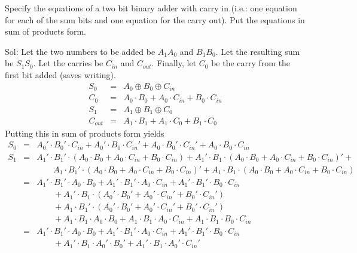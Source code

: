 \begin{example}
Specify the equations of a two bit binary adder with carry in (i.e.: one equation for each of the sum bits and one equation for the carry out).  Put the equations in sum of products form.

{\color{ans}Sol:
Let the two numbers to be added be $A_1 A_0$ and $B_1 B_0$.  Let the resulting sum be $S_1 S_0$.  Let the carries be $C_{in}$ and $C_{out}$.  Finally, let $C_0$ be the carry from the first bit added (saves writing).
\begin{eqnarray}
S_0 & = & A_0 \oplus B_0 \oplus C_{in} \\
C_0 & = & A_0\cdot B_0 + A_0\cdot C_{in} + B_0\cdot C_{in} \\
S_1 & = & A_1 \oplus B_1 \oplus C_0\\
C_{out} & = & A_1 \cdot B_1 + A_1 \cdot C_0 + B_1 \cdot C_0
\end{eqnarray}
Putting this in sum of products form yields
\begin{eqnarray}
S_0 & = & A_0' \cdot B_0' \cdot C_{in} +
          A_0' \cdot B_0 \cdot C_{in}' +
          A_0 \cdot B_0' \cdot C_{in}' +
          A_0 \cdot B_0 \cdot C_{in} \\
S_1 & = & A_1' \cdot B_1' \cdot (A_0\cdot B_0 + A_0\cdot C_{in} + B_0\cdot C_{in}) +
          A_1' \cdot B_1 \cdot (A_0\cdot B_0 + A_0\cdot C_{in} + B_0\cdot C_{in})' + \\
    & & \qquad A_1 \cdot B_1' \cdot (A_0\cdot B_0 + A_0\cdot C_{in} + B_0\cdot C_{in})' +
          A_1 \cdot B_1 \cdot (A_0\cdot B_0 + A_0\cdot C_{in} + B_0\cdot C_{in}) \\
    & = & A_1' \cdot B_1' \cdot A_0\cdot B_0 + A_1' \cdot B_1' \cdot A_0 \cdot C_{in}
          + A_1' \cdot B_1' \cdot B_0\cdot C_{in} \\
    & & \qquad
          + A_1' \cdot B_1 \cdot (A_0'\cdot B_0' + A_0'\cdot C_{in}' + B_0'\cdot C_{in}') \\
    & & \qquad
          + A_1 \cdot B_1' \cdot (A_0'\cdot B_0' + A_0'\cdot C_{in}' + B_0'\cdot C_{in}') \\
    & & \qquad
          + A_1 \cdot B_1 \cdot A_0\cdot B_0 + A_1 \cdot B_1 \cdot A_0\cdot C_{in}
           + A_1 \cdot B_1 \cdot B_0\cdot C_{in} \\
    & = & A_1' \cdot B_1' \cdot A_0\cdot B_0 + A_1' \cdot B_1' \cdot A_0 \cdot C_{in}
          + A_1' \cdot B_1' \cdot B_0\cdot C_{in} \\
    & & \qquad
          + A_1' \cdot B_1 \cdot A_0'\cdot B_0' + A_1' \cdot B_1 \cdot A_0'\cdot C_{in}'

\end{eqnarray}}
\end{example}
